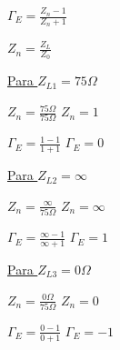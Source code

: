 \documentclass[12pt]{article}
\begin{document}
$\Gamma_E = \frac{Z_n-1}{Z_n+1}$  \vspace{0.5cm}

$Z_n = {\frac{Z_L}{Z_0}}$    \vspace{0.5cm}

\underline{Para $Z_{L1}=75\Omega$}
\begin{center}
$Z_n = {\frac{75 \Omega}{75 \Omega}}$ \hspace{0.5cm}   $Z_n = 1$ \hspace{0.5cm} 
\vspace{0.5cm}

$\Gamma_E = \frac{1-1}{1+1}$  \hspace{0.5cm} $\Gamma_E = 0$ 
\end{center}

\underline{Para $Z_{L2}=\infty$}
\begin{center}
$Z_n = {\frac{\infty}{75 \Omega}}$ \hspace{0.5cm}  $Z_n = \infty$ \hspace{0.5cm} 
\vspace{0.5cm}

$\Gamma_E = \frac{\infty-1}{\infty+1}$  \hspace{0.5cm} $\Gamma_E = 1$ 
\end{center}


\underline{Para $Z_{L3}=0\Omega$}
\begin{center}
$Z_n = {\frac{0\Omega}{75 \Omega}}$ \hspace{0.5cm}  $Z_n = 0$ \hspace{0.5cm} 
\vspace{0.5cm}

$\Gamma_E = \frac{0-1}{0+1}$  \hspace{0.5cm} $\Gamma_E = -1$ 
\end{center}

\end{document}
